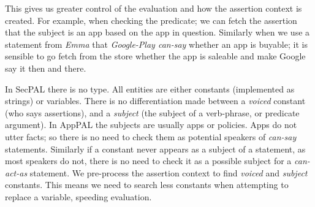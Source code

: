 \documentclass[]{llncs}
\begin{document}
This gives us greater control of the evaluation and how the assertion context is created.
For example, when checking the  predicate;
  we can fetch the assertion that the subject is an app based on the app in question.
Similarly when we use a statement from \emph{Emma} that \emph{Google-Play can-say} whether an app is buyable;
  it is sensible to go fetch from the store whether the app is saleable and make Google say it then and there.

In SecPAL there is no type.
All entities are either constants (implemented as strings) or variables.
There is no differentiation made between a \emph{voiced} constant (who says assertions),
and a \emph{subject} (the subject of a verb-phrase, or predicate argument).
In AppPAL the subjects are usually apps or policies.
Apps do not utter facts;
  so there is no need to check them as potential speakers of \emph{can-say} statements.
Similarly if a constant never appears as a subject of a statement, as most speakers do not,
  there is no need to check it as a possible subject for a \emph{can-act-as} statement.
We pre-process the assertion context to find \emph{voiced} and \emph{subject} constants.
This means we need to search less constants when attempting to replace a variable, speeding evaluation.
\end{document}
